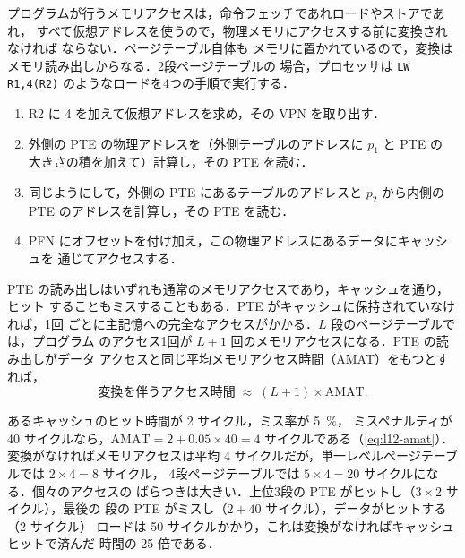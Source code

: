 \documentclass[../main.tex]{subfiles}
\begin{document}
プログラムが行うメモリアクセスは，命令フェッチであれロードやストアであれ，
すべて仮想アドレスを使うので，物理メモリにアクセスする前に変換されなければ
ならない．ページテーブル自体も
メモリに置かれているので，変換はメモリ読み出しからなる．2段ページテーブルの
場合，プロセッサは \texttt{LW R1,4(R2)} のようなロードを4つの手順で実行する．
\begin{enumerate}
  \item R2 に 4 を加えて仮想アドレスを求め，その VPN を取り出す．
  \item 外側の PTE の物理アドレスを（外側テーブルのアドレスに $p_1$ と PTE の
    大きさの積を加えて）計算し，その PTE を読む．
  \item 同じようにして，外側の PTE にあるテーブルのアドレスと $p_2$ から内側の
    PTE のアドレスを計算し，その PTE を読む．
  \item PFN にオフセットを付け加え，この物理アドレスにあるデータにキャッシュを
    通じてアクセスする．
\end{enumerate}
PTE の読み出しはいずれも通常のメモリアクセスであり，キャッシュを通り，ヒット
することもミスすることもある．PTE がキャッシュに保持されていなければ，1回
ごとに主記憶への完全なアクセスがかかる．$L$ 段のページテーブルでは，プログラム
のアクセス1回が $L + 1$ 回のメモリアクセスになる．PTE の読み出しがデータ
アクセスと同じ平均メモリアクセス時間（AMAT）をもつとすれば，
\begin{equation}
  \text{変換を伴うアクセス時間} \;\approx\; (L + 1) \times \text{AMAT} .
  \label{eq:l13-walk-time}
\end{equation}

\begin{example}
  \label{ex:l13-access-time}
  あるキャッシュのヒット時間が 2 サイクル，ミス率が \SI{5}{\percent}，
  ミスペナルティが 40 サイクルなら，$\text{AMAT} = 2 + 0.05 \times 40 = 4$
  サイクルである（\cref{eq:l12-amat}）．変換がなければメモリアクセスは平均
  4 サイクルだが，単一レベルページテーブルでは $2 \times 4 = 8$ サイクル，
  4段ページテーブルでは $5 \times 4 = 20$ サイクルになる．個々のアクセスの
  ばらつきは大きい．上位3段の PTE がヒットし（$3 \times 2$ サイクル），最後の
  段の PTE がミスし（$2 + 40$ サイクル），データがヒットする（2 サイクル）
  ロードは 50 サイクルかかり，これは変換がなければキャッシュヒットで済んだ
  時間の 25 倍である．
\end{example}
\end{document}
